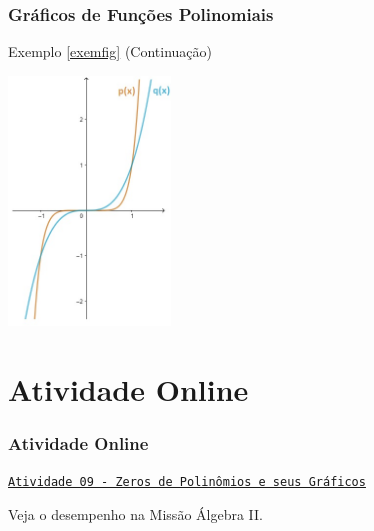 \documentclass[brazil, notheorems, 10pt]{beamer}
\begin{document}
\begin{frame}
\frametitle{Gráficos de Funções Polinomiais} %
\begin{block}{Exemplo \ref{exemfig} (Continuação)}


\begin{center}
\includegraphics[width=4.3cm]{figures/2graf.jpg}
\end{center}


\end{block}

\end{frame}

\section{Atividade Online}
\begin{frame}
\frametitle{Atividade Online} %

\href{https://pt.khanacademy.org/math/algebra2/polynomial-functions/zeros-of-polynomials-and-their-graphs/e/using-zeros-to-graph-polynomials}
{{\tt Atividade 09 - Zeros de Polinômios e seus Gráficos}}


Veja o desempenho na Missão Álgebra II.


\end{frame}


\end{document}
